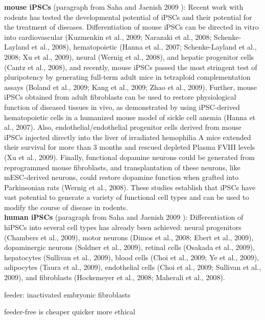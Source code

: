 \textbf{mouse iPSCs} (paragraph from Saha and Jaenish 2009 \cite{saha2009technical}):
Recent work with rodents has tested the developmental potential of iPSCs and their potential for the treatment of diseases. 
Differentiation of mouse iPSCs can be directed in vitro into cardiovascular (Kuzmenkin et al., 2009; Narazaki et al., 2008; Schenke-Layland et al., 2008), hematopoietic (Hanna et al., 2007; Schenke-Layland et al., 2008; Xu et al., 2009), neural (Wernig et al., 2008), and hepatic progenitor cells (Cantz et al., 2008), and recently, mouse iPSCs passed the most stringent test of pluripotency by generating full-term adult mice in tetraploid complementation assays (Boland et al., 2009; Kang et al., 2009; Zhao et al., 2009). 
Further, mouse iPSCs obtained from adult fibroblasts can be used to restore physiological function of diseased tissues in vivo, as demonstrated by using iPSC-derived hematopoietic cells in a humanized mouse model of sickle cell anemia (Hanna et al., 2007). 
Also, endothelial/endothelial progenitor cells derived from mouse iPSCs injected directly into the liver of irradiated hemophilia A mice extended their survival for more than 3 months and rescued depleted Plasma FVIII levels (Xu et al., 2009). Finally, functional dopamine neurons could be generated from reprogrammed mouse fibroblasts, and transplantation of these neurons, like mESC-derived neurons, could restore dopamine function when grafted into Parkinsonian rats (Wernig et al., 2008). These studies establish that iPSCs have vast potential to generate a variety of functional cell types and can be used to modify the course of disease in rodents.\\

\textbf{human iPSCs} (paragraph from Saha and Jaenish 2009 \cite{saha2009technical}):
Differentiation of hiPSCs into several cell types has already been achieved: neural progenitors (Chambers et al., 2009), motor neurons (Dimos et al., 2008; Ebert et al., 2009), dopaminergic neurons (Soldner et al., 2009), retinal cells (Osakada et al., 2009), hepatocytes (Sullivan et al., 2009), blood cells (Choi et al., 2009; Ye et al., 2009), adipocytes (Taura et al., 2009), endothelial cells (Choi et al., 2009; Sullivan et al., 2009), and fibroblasts (Hockemeyer et al., 2008; Maherali et al., 2008). 





feeder: inactivated embryonic fibroblasts

feeder-free is cheaper quicker more ethical

